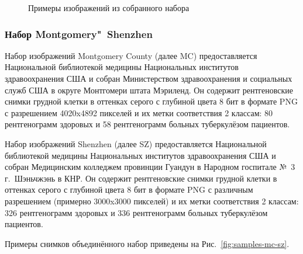 \begin{figure}[ht]
	\caption{Примеры изображений из собранного набора}
	\label{fig:samples-yak-hardness}
\end{figure}

\subsubsection{Набор Montgomery"~Shenzhen} \label{subsubsec:dataset-mc-sz}

Набор изображений Montgomery County (далее MC) предоставляется Национальной библиотекой медицины Национальных институтов здравоохранения США и собран Министерством здравоохранения и социальных служб США в округе Монтгомери штата Мэриленд. Он содержит рентгеновские снимки грудной клетки в оттенках серого с глубиной цвета 8 бит в формате PNG с разрешением 4020x4892 пикселей и их метки соответствия 2 классам: 80 рентгенограмм здоровых и 58 рентгенограмм больных туберкулёзом пациентов. %


Набор изображений Shenzhen (далее SZ) предоставляется Национальной библиотекой медицины Национальных институтов здравоохранения США и собран Медицинским колледжем провинции Гуандун в Народном госпитале №~3 г.~Шэньчжэнь в КНР. Он содержит рентгеновские снимки грудной клетки в оттенках серого с глубиной цвета 8 бит в формате PNG с различным разрешением (примерно 3000x3000 пикселей) и их метки соответствия 2 классам: 326 рентгенограмм здоровых и 336 рентгенограмм больных туберкулёзом пациентов.

Примеры снимков объединённого набор приведены на Рис.~\ref{fig:samples-mc-sz}.


